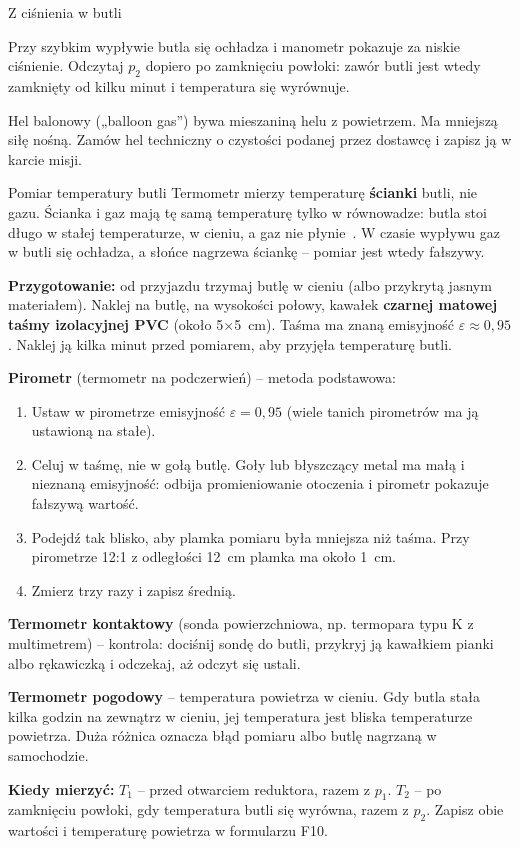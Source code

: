 \begin{podsekcja}{Z ciśnienia w butli}
\begin{uwaga}Przy szybkim wypływie butla się ochładza i manometr pokazuje za niskie ciśnienie. Odczytaj $p_2$ dopiero po zamknięciu powłoki: zawór butli jest wtedy zamknięty od kilku minut i temperatura się wyrównuje.\end{uwaga}

Hel balonowy („balloon gas”) bywa mieszaniną helu z powietrzem. Ma mniejszą siłę nośną. Zamów hel techniczny o czystości podanej przez dostawcę i zapisz ją w karcie misji.
\end{podsekcja}

\begin{podsekcja}{Pomiar temperatury butli}\label{sec:temp-butli}
Termometr mierzy temperaturę \textbf{ścianki} butli, nie gazu. Ścianka i gaz mają tę samą temperaturę tylko w równowadze: butla stoi długo w stałej temperaturze, w cieniu, a gaz nie płynie~\cite[rozdz.~6]{nasahb}. W czasie wypływu gaz w butli się ochładza, a słońce nagrzewa ściankę -- pomiar jest wtedy fałszywy.

\textbf{Przygotowanie:} od przyjazdu trzymaj butlę w cieniu (albo przykrytą jasnym materiałem). Naklej na butlę, na wysokości połowy, kawałek \textbf{czarnej matowej taśmy izolacyjnej PVC} (około 5$\times$\SI{5}{cm}). Taśma ma znaną emisyjność $\varepsilon \approx 0{,}95$. Naklej ją kilka minut przed pomiarem, aby przyjęła temperaturę butli.

\textbf{Pirometr} (termometr na podczerwień) -- metoda podstawowa:
\begin{enumerate}
  \item Ustaw w pirometrze emisyjność $\varepsilon = 0{,}95$ (wiele tanich pirometrów ma ją ustawioną na stałe).
  \item Celuj w taśmę, nie w gołą butlę. Goły lub błyszczący metal ma małą i nieznaną emisyjność: odbija promieniowanie otoczenia i pirometr pokazuje fałszywą wartość.
  \item Podejdź tak blisko, aby plamka pomiaru była mniejsza niż taśma. Przy pirometrze 12:1 z odległości \SI{12}{cm} plamka ma około \SI{1}{cm}.
  \item Zmierz trzy razy i zapisz średnią.
\end{enumerate}

\textbf{Termometr kontaktowy} (sonda powierzchniowa, np. termopara typu K z multimetrem) -- kontrola: dociśnij sondę do butli, przykryj ją kawałkiem pianki albo rękawiczką i odczekaj, aż odczyt się ustali.

\textbf{Termometr pogodowy} -- temperatura powietrza w cieniu. Gdy butla stała kilka godzin na zewnątrz w cieniu, jej temperatura jest bliska temperaturze powietrza. Duża różnica oznacza błąd pomiaru albo butlę nagrzaną w samochodzie.

\textbf{Kiedy mierzyć:} $T_1$ -- przed otwarciem reduktora, razem z $p_1$. $T_2$ -- po zamknięciu powłoki, gdy temperatura butli się wyrówna, razem z $p_2$. Zapisz obie wartości i temperaturę powietrza w formularzu F10.
\end{podsekcja}

